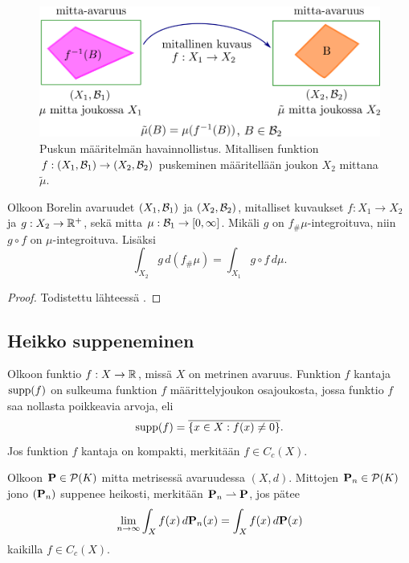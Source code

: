 \documentclass[12pt,oneside,a4paper]{amsbook} %
\begin{document}
\begin{figure}
    \centering
    \includegraphics[scale=0.4]{graphics/push-forward.png}
    \caption{Puskun määritelmän havainnollistus. Mitallisen funktion $f: (X_1, \Borel_1) \to (X_2, \Borel_2)$ puskeminen määritellään joukon $X_2$ mittana $\tilde \mu$.}
    \label{fig:push-forward}
\end{figure}

\begin{theorem}\label{thm:push-cov}
    Olkoon Borelin avaruudet $(X_1, \Borel_1)$ ja $(X_2, \Borel_2)$, mitalliset kuvaukset $f: X_1 \to X_2$ ja $g: X_2 \to \R^+$, sekä mitta $\mu:\Borel_1 \to [0, \infty]$. Mikäli $g$ on $f_\#\mu$-integroituva, niin  $g \circ f$ on $\mu$-integroituva. Lisäksi
    \begin{equation*}
        \int_{X_2} g \, d(f_{\#} \mu) = \int_{X_1} g \circ f \, d\mu.
    \end{equation*}
\end{theorem}
\begin{proof}
Todistettu lähteessä \cite[s. 190]{bogachev}.
\end{proof}



\subsection{Heikko suppeneminen} 

\begin{definition}
    Olkoon funktio $f:X \to \R$, missä $X$ on metrinen avaruus. Funktion $f$ kantaja $\supp(f)$ on sulkeuma funktion $f$ määrittelyjoukon osajoukosta, jossa funktio $f$ saa nollasta poikkeavia arvoja, eli
    \begin{equation*}
        \supp(f) = \overline{\{x \in X : f(x) \ne 0\}}.
    \end{equation*}
     Jos funktion $f$ kantaja on kompakti, merkitään $f \in C_c(X)$.
\end{definition}

\begin{definition} \label{def:weakConv}
    Olkoon $\P \in \mathcal{P}(K)$ mitta metrisessä avaruudessa $(X, d)$. Mittojen $\P_n \in \mathcal{P}(K)$ jono $(\P_n)$ suppenee heikosti, merkitään $\P_n \rightharpoonup \P$, jos pätee 
    \begin{equation*}
        \lim_{n\to\infty} \int_X f(x) \, d\P_n (x) = \int_X f(x) \, d\P(x)
    \end{equation*}
    kaikilla $f \in C_c(X)$.
\end{definition}
\end{document}
